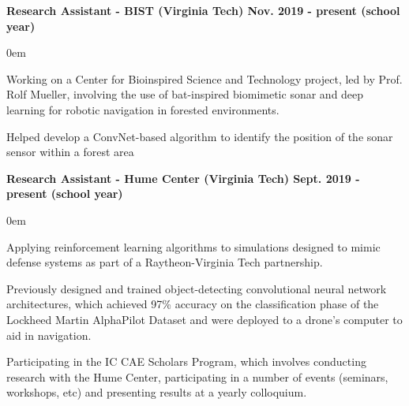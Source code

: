 \documentclass{article}
\begin{document}
\begin{center}
\begin{flushleft}
    \textbf{Research Assistant - BIST (Virginia Tech) \hfill Nov. 2019 - present (school year)}
    \begin{compactitem}
      \itemsep0em
      \item Working on a Center for Bioinspired Science and Technology project, led by Prof. Rolf Mueller, involving the use of bat-inspired biomimetic sonar and deep learning for robotic navigation in forested environments.
      \item Helped develop a ConvNet-based algorithm to identify the position of the sonar sensor within a forest area
    \end{compactitem}

    \textbf{Research Assistant - Hume Center (Virginia Tech) \hfill Sept. 2019 - present (school year)}
    \begin{compactitem}
      \itemsep0em
      \item Applying reinforcement learning algorithms to simulations designed to mimic defense systems as part of a Raytheon-Virginia Tech partnership.
      \item Previously designed and trained object-detecting convolutional neural network architectures, which achieved 97\% accuracy on the classification phase of the Lockheed Martin AlphaPilot Dataset and were deployed to a drone's computer to aid in navigation.
      \item Participating in the IC CAE Scholars Program, which involves conducting research with the Hume Center, participating in a number of events (seminars, workshops, etc) and presenting results at a yearly colloquium.
    \end{compactitem}


\end{flushleft}
\end{center}
\end{document}
